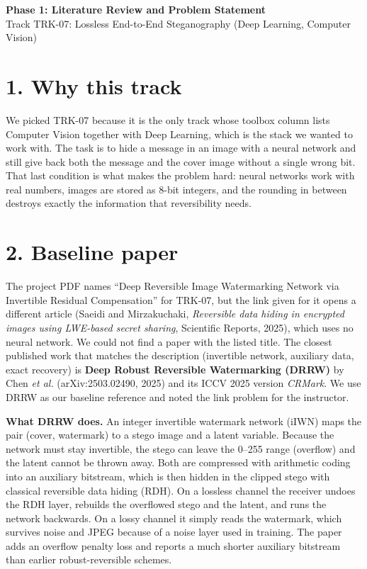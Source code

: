 \documentclass[10pt,a4paper]{article}
\begin{document}
\thispagestyle{uct}
\begin{center}
{\large\bfseries Phase 1: Literature Review and Problem Statement}\\[2pt]
Track TRK-07: Lossless End-to-End Steganography (Deep Learning, Computer Vision)
\end{center}

\section*{1. Why this track}
We picked TRK-07 because it is the only track whose toolbox column lists Computer Vision together with Deep Learning,
which is the stack we wanted to work with. The task is to hide a message in an image with a neural network and still
give back both the message and the cover image without a single wrong bit. That last condition is what makes the
problem hard: neural networks work with real numbers, images are stored as 8-bit integers, and the rounding in
between destroys exactly the information that reversibility needs.

\section*{2. Baseline paper}
The project PDF names ``Deep Reversible Image Watermarking Network via Invertible Residual Compensation'' for TRK-07,
but the link given for it opens a different article (Saeidi and Mirzakuchaki, \emph{Reversible data hiding in
encrypted images using LWE-based secret sharing}, Scientific Reports, 2025), which uses no neural network. We could not
find a paper with the listed title. The closest published work that matches the description (invertible network,
auxiliary data, exact recovery) is \textbf{Deep Robust Reversible Watermarking (DRRW)} by Chen \emph{et al.}
(arXiv:2503.02490, 2025) and its ICCV 2025 version \emph{CRMark}. We use DRRW as our baseline reference and noted the
link problem for the instructor.

\textbf{What DRRW does.} An integer invertible watermark network (iIWN) maps the pair (cover, watermark) to a stego
image and a latent variable. Because the network must stay invertible, the stego can leave the 0--255 range (overflow)
and the latent cannot be thrown away. Both are compressed with arithmetic coding into an auxiliary bitstream, which is
then hidden in the clipped stego with classical reversible data hiding (RDH). On a lossless channel the receiver
undoes the RDH layer, rebuilds the overflowed stego and the latent, and runs the network backwards. On a lossy channel
it simply reads the watermark, which survives noise and JPEG because of a noise layer used in training. The paper
adds an overflow penalty loss and reports a much shorter auxiliary bitstream than earlier robust-reversible schemes.
\end{document}
